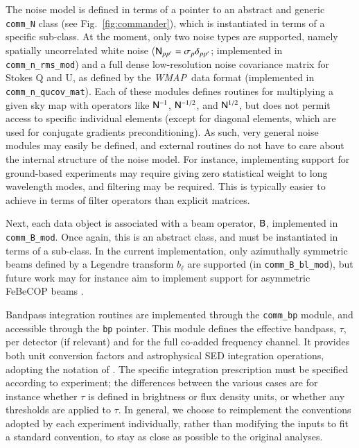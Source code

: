 \documentclass[twocolumn]{aa}
\def\WMAP{\emph{WMAP}}
\newcommand{\B}[0]{\tens{B}}
\newcommand{\N}[0]{\tens{N}}
\begin{document}
The noise model is defined in terms of a pointer to an abstract and
generic \texttt{comm\_N} class (see Fig.~\ref{fig:commander}), which
is instantiated in terms of a specific sub-class. At the moment, only
two noise types are supported, namely spatially uncorrelated white
noise ($\N_{pp'} = \sigma_p\delta_{pp'}$; implemented in
\texttt{comm\_n\_rms\_mod}) and a full dense low-resolution noise
covariance matrix for Stokes Q and U, as defined by the
\WMAP\ data format (implemented in \texttt{comm\_n\_qucov\_mat}). Each
of these modules defines routines for multiplying a given sky map with
operators like $\N^{-1}$, $\N^{-1/2}$, and $\N^{1/2}$, but does not
permit access to specific individual elements (except for diagonal
elements, which are used for conjugate gradients preconditioning). As
such, very general noise modules may easily be defined, and external
routines do not have to care about the internal structure of the noise
model. For instance, implementing support for ground-based experiments
may require giving zero statistical weight to long wavelength modes,
and filtering may be required. This is typically easier to achieve in
terms of filter operators than explicit matrices.

Next, each data object is associated with a beam operator, $\B$,
implemented in \texttt{comm\_B\_mod}. Once again, this is an abstract
class, and must be instantiated in terms of a sub-class. In the
current implementation, only azimuthally symmetric beams defined by a
Legendre transform $b_{\ell}$ are supported (in
\texttt{comm\_B\_bl\_mod}), but future work may for instance aim to
implement support for asymmetric FeBeCOP beams \citep{mitra2010}.

Bandpass integration routines are implemented through the
\texttt{comm\_bp} module, and accessible through the \texttt{bp}
pointer. This module defines the effective bandpass, $\tau$, per
detector (if relevant) and for the full co-added frequency channel. It
provides both unit conversion factors and astrophysical SED
integration operations, adopting the notation of
\citet{planck2013-p03d,BP09}. The specific integration prescription
must be specified according to experiment; the differences between the
various cases are for instance whether $\tau$ is defined in brightness
or flux density units, or whether any thresholds are applied to
$\tau$. In general, we choose to reimplement the conventions adopted
by each experiment individually, rather than modifying the inputs to
fit a standard convention, to stay as close as possible to the
original analyses.
\end{document}
